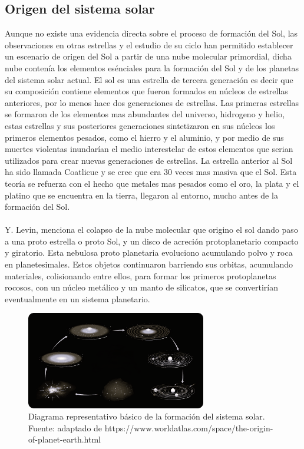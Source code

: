 \documentclass[12pt]{article}
\begin{document}
\subsection{Origen del sistema solar}\label{sec:origen_solar}
Aunque no existe una evidencia directa sobre el proceso de formación del Sol, las observaciones en 
otras estrellas y el estudio de su ciclo han permitido establecer un escenario de origen del Sol a 
partir de una nube molecular primordial\parencite{TheFormationandEvolutionoftheSolarSystem}, dicha nube 
contenía los elementos esénciales para la formación del Sol y de los planetas del sistema solar actual. 
El sol es una estrella de tercera generación es decir que su composición contiene elementos que fueron 
formados en núcleos de estrellas anteriores, por lo menos hace dos generaciones de estrellas. Las 
primeras estrellas se formaron de los elementos mas abundantes del universo, hidrogeno y helio, estas 
estrellas y sus posteriores generaciones sintetizaron en sus núcleos los primeros elementos pesados, como 
el hierro y el aluminio, y por medio de sus muertes violentas inundarían el medio interestelar de estos 
elementos que serian utilizados para crear nuevas generaciones de estrellas. La estrella anterior al Sol 
ha sido llamada Coatlicue y se cree que era 30 veces mas masiva que el Sol. Esta teoría se refuerza con 
el hecho que metales mas pesados como el oro, la plata y el platino que se encuentra en la tierra, llegaron 
al entorno, mucho antes de la formación del Sol\parencite{Sun}.\\
\\
Y. Levin\parencite{levin2003origin}, menciona el colapso de la nube molecular que origino el sol dando 
paso a una proto estrella o proto Sol, y un disco de acreción protoplanetario compacto y giratorio. 
Esta nebulosa proto planetaria evoluciono acumulando polvo y roca en planetesimales. Estos objetos 
continuaron barriendo sus orbitas, acumulando materiales, colisionando entre ellos, para formar los 
primeros protoplanetas rocosos, con un núcleo metálico y un manto de silicatos, que se convertirían 
eventualmente en un sistema planetario.
\begin{figure}[H]
    \includegraphics[width=0.7\textwidth]{images/System_solar_origin.png}
    \centering
    \caption{Diagrama representativo básico de la formación del sistema solar.
    Fuente: adaptado de https://www.worldatlas.com/space/the-origin-of-planet-earth.html}
    \label{fig:formation_solar_System}
\end{figure}
\end{document}
